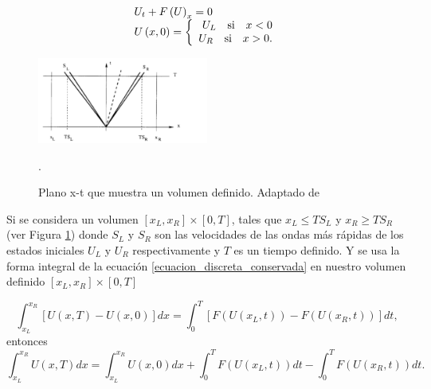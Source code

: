 \documentclass[12pt,a4paper]{book}
\begin{document}
\begin{equation} \label{ecuacion_discreta_conservada}
\begin{array}{ll}
U_t + F \left( U \right)_x = 0 \\
U \left(x,0 \right) = 
\left\lbrace
\begin{array}{rr}
U_L \quad \textup{si} \quad x<0  \\
U_R \quad \textup{si} \quad x>0.
\end{array}
\right.
\end{array}
\end{equation}

\begin{figure} %
  \centering
    \includegraphics[width=0.5\textwidth]{Figuras/HLL_onda.png}
  \caption{Plano x-t que muestra un volumen definido. Adaptado de \citet{Toro1997}}.
  \label{fig:Plano x_t}
\end{figure}

\noindent Si se considera un volumen $\left[x_L, x_R \right]\times \left[ 0 , T \right]$, tales que $x_L \leq TS_L$ y $x_R \geq TS_R$ (ver Figura \ref{fig:Plano x_t}) donde $S_L$ y $S_R$ son las velocidades de las ondas más 
rápidas de los estados iniciales $U_L$ y $U_R$ respectivamente y $T$ es un tiempo definido. Y se usa la forma integral de la 
ecuación   \ref{ecuacion_discreta_conservada} en nuestro volumen definido $\left[x_L, x_R \right]\times \left[ 0 , T \right]$

\begin{equation*}\label{Forma_integral_conservadas}
\int_{x_L}^{x_R} \left[ U\left( x, T \right) -
 U\left( x, 0 \right) \right] dx = 
 \int_{0}^{T} \left[ F \left(U\left( x_L, t \right) \right) -
 F \left(U\left( x_R, t \right) \right) \right] dt, 
\end{equation*}
entonces
\begin{equation}\label{integral_consistencia}
\int_{x_L}^{x_R} U\left( x, T \right) dx =\int_{x_L}^{x_R} U\left( x, 0 \right) dx+
\int_{0}^{T}  F \left(U\left( x_L, t \right) \right)dt -
\int_{0}^{T}  F \left(U\left( x_R, t \right) \right) dt.
\end{equation}
\end{document}

